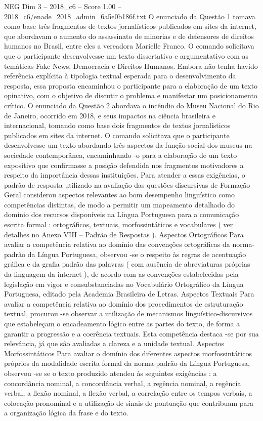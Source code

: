 \begin{textsample}{NEG Dim 3 – 2018\_c6 – Score 1.00 – 2018\_c6/enade\_2018\_admin\_6a5e0b186f.txt}
O enunciado da Questão 1 tomava como base três fragmentos de textos jornalísticos publicados em sites da internet, que abordavam o aumento do assassinato de minorias e de defensores de direitos humanos no Brasil, entre eles a vereadora Marielle Franco.
O comando solicitava que o participante desenvolvesse um texto dissertativo e argumentativo com as temáticas Fake News, Democracia e Direitos Humanos.
Embora não tenha havido referência explícita à tipologia textual esperada para o desenvolvimento da resposta, essa proposta encaminhou o participante para a elaboração de um texto opinativo, com o objetivo de discutir o problema e manifestar um posicionamento crítico.
O enunciado da Questão 2 abordava o incêndio do Museu Nacional do Rio de Janeiro, ocorrido em 2018, e seus impactos na ciência brasileira e internacional, tomando como base dois fragmentos de textos jornalísticos publicados em sites da internet.
O comando solicitava que o participante desenvolvesse um texto abordando três aspectos da função social dos museus na sociedade contemporânea, encaminhando -o para a elaboração de um texto expositivo que confirmasse a posição defendida nos fragmentos motivadores a respeito da importância dessas instituições.
Para atender a essas exigências, o padrão de resposta utilizado na avaliação das questões discursivas de Formação Geral considerou aspectos relevantes ao bom desempenho linguístico como competências distintas, de modo a permitir um mapeamento detalhado do domínio dos recursos disponíveis na Língua Portuguesa para a comunicação escrita formal : ortográficos, textuais, morfossintáticos e vocabulares ( ver detalhes no Anexo VIII – Padrão de Respostas ).
Aspectos Ortográficos Para avaliar a competência relativa ao domínio das convenções ortográficas da norma-padrão da Língua Portuguesa, observou -se o respeito às regras de acentuação gráfica e da grafia padrão das palavras ( com ausência de abreviaturas próprias da linguagem da internet ), de acordo com as convenções estabelecidas pela legislação em vigor e consubstanciadas no Vocabulário Ortográfico da Língua Portuguesa, editado pela Academia Brasileira de Letras.
Aspectos Textuais Para avaliar a competência relativa ao domínio dos procedimentos de estruturação textual, procurou -se observar a utilização de mecanismos linguístico-discursivos que estabeleçam o encadeamento lógico entre as partes do texto, de forma a garantir a progressão e a coerência textuais.
Esta competência destaca -se por sua relevância, já que são avaliadas a clareza e a unidade textual.
Aspectos Morfossintáticos Para avaliar o domínio dos diferentes aspectos morfossintáticos próprios da modalidade escrita formal da norma-padrão da Língua Portuguesa, observou -se se o texto produzido atendeu às seguintes exigências : a concordância nominal, a concordância verbal, a regência nominal, a regência verbal, a flexão nominal, a flexão verbal, a correlação entre os tempos verbais, a colocação pronominal e a utilização de sinais de pontuação que contribuam para a organização lógica da frase e do texto.

\end{textsample}

